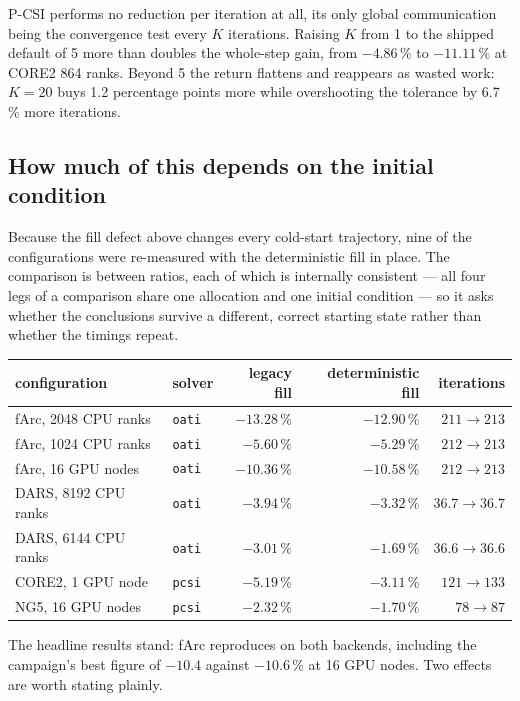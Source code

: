 \documentclass[11pt,a4paper]{article}
\begin{document}
P-CSI performs no reduction per iteration at all, its only global communication being the
convergence test every $K$ iterations. Raising $K$ from 1 to the shipped default of 5 more than
doubles the whole-step gain, from $-4.86$\,\% to $-11.11$\,\% at CORE2 864 ranks. Beyond 5 the
return flattens and reappears as wasted work: $K=20$ buys 1.2 percentage points more while
overshooting the tolerance by 6.7\,\% more iterations.

\subsection{How much of this depends on the initial condition}

Because the fill defect above changes every cold-start trajectory, nine of the configurations
were re-measured with the deterministic fill in place. The comparison is between ratios, each
of which is internally consistent --- all four legs of a comparison share one allocation and
one initial condition --- so it asks whether the conclusions survive a different, correct
starting state rather than whether the timings repeat.

\begin{center}\small
\begin{tabular}{llrrr}
\toprule
configuration & solver & legacy fill & deterministic fill & iterations \\
\midrule
fArc, 2048 CPU ranks  & \texttt{oati} & $-13.28$\,\% & $-12.90$\,\% & $211 \to 213$ \\
fArc, 1024 CPU ranks  & \texttt{oati} & $-5.60$\,\%  & $-5.29$\,\%  & $212 \to 213$ \\
fArc, 16 GPU nodes    & \texttt{oati} & $-10.36$\,\% & $-10.58$\,\% & $212 \to 213$ \\
DARS, 8192 CPU ranks  & \texttt{oati} & $-3.94$\,\%  & $-3.32$\,\%  & $36.7 \to 36.7$ \\
DARS, 6144 CPU ranks  & \texttt{oati} & $-3.01$\,\%  & $-1.69$\,\%  & $36.6 \to 36.6$ \\
CORE2, 1 GPU node     & \texttt{pcsi} & $-5.19$\,\%  & $-3.11$\,\%  & $121 \to 133$ \\
NG5, 16 GPU nodes     & \texttt{pcsi} & $-2.32$\,\%  & $-1.70$\,\%  & $78 \to 87$ \\
\bottomrule
\end{tabular}
\end{center}

\noindent
The headline results stand: fArc reproduces on both backends, including the campaign's best
figure of $-10.4$ against $-10.6$\,\% at 16 GPU nodes. Two effects are worth stating plainly.
\end{document}
